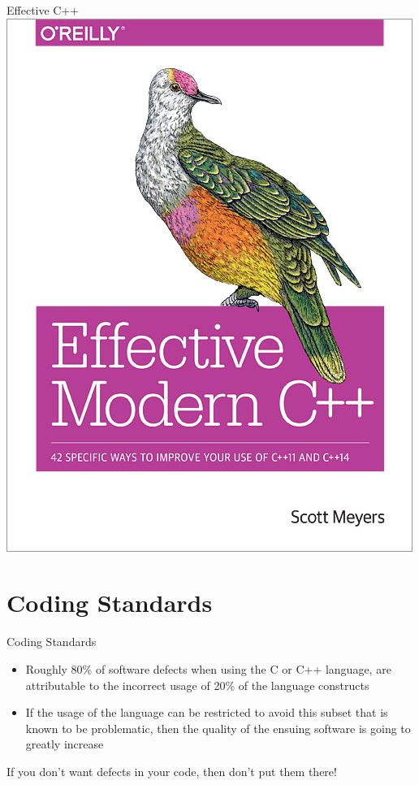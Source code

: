 \documentclass{beamer}
\begin{document}
\begin{frame}{Effective C++}
\includegraphics[scale=0.25]{img/EffectiveModernC++.png}
\end{frame}


\part{Coding Standards}

\begin{frame}{Coding Standards}
\begin{itemize}
  \item Roughly 80\% of software defects when using the C or C++ language, are
  attributable to the incorrect usage of 20\% of the language constructs
  \item If the usage of the language can be restricted to avoid this subset that
  is known to be problematic, then the quality of the ensuing software is going
  to greatly increase
\end{itemize}
\begin{center}
\huge If you don’t want defects in your code, then don’t put them there!
\end{center}
\end{frame}
\end{document}

